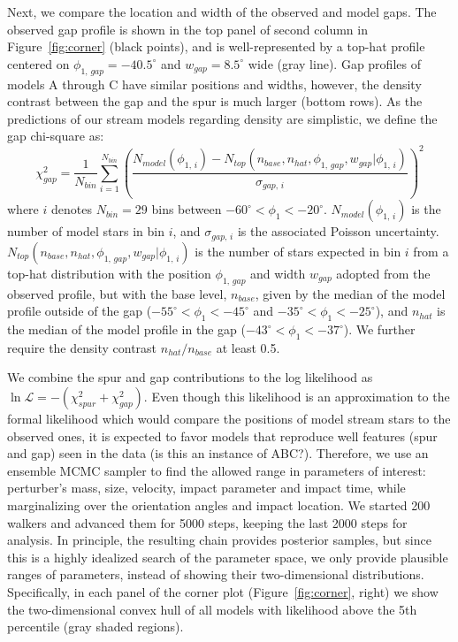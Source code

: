 \documentclass[12pt, modern]{aastex62}
\begin{document}
Next, we compare the location and width of the observed and model gaps.
The observed gap profile is shown in the top panel of second column in Figure~\ref{fig:corner} (black points), and is well-represented by a top-hat profile centered on $\phi_{1,\,gap}=-40.5^\circ$ and $w_{gap}=8.5^\circ$ wide (gray line).
Gap profiles of models A through C have similar positions and widths, however, the density contrast between the gap and the spur is much larger (bottom rows).
As the predictions of our stream models regarding density are simplistic, we define the gap chi-square as:
\begin{equation}
\chi^2_{gap} = \frac{1}{N_{bin}}\sum_{i=1}^{N_{bin}} \left(\frac{N_{model}(\phi_{1,\,i}) - N_{top}(n_{base}, n_{hat}, \phi_{1,\,gap}, w_{gap} | \phi_{1,\,i})}{\sigma_{gap,\,i}}\right)^2
\end{equation}
where $i$ denotes $N_{bin}=29$ bins between $-60^\circ<\phi_1<-20^\circ$.
$N_{model}(\phi_{1,\,i})$ is the number of model stars in bin $i$, and $\sigma_{gap,\,i}$ is the associated Poisson uncertainty.
$N_{top}(n_{base}, n_{hat}, \phi_{1,\,gap}, w_{gap} | \phi_{1,\,i})$ is the number of stars expected in bin $i$ from a top-hat distribution with the position $\phi_{1,\,gap}$ and width $w_{gap}$ adopted from the observed profile, but with the base level, $n_{base}$, given by the median of the model profile outside of the gap ($-55^\circ<\phi_1<-45^\circ$ and $-35^\circ<\phi_1<-25^\circ$), and $n_{hat}$ is the median of the model profile in the gap ($-43^\circ<\phi_1<-37^\circ$).
We further require the density contrast $n_{hat} / n_{base}$ at least 0.5.

We combine the spur and gap contributions to the log likelihood as $\ln\mathcal{L} = -(\chi^2_{spur} + \chi^2_{gap})$.
Even though this likelihood is an approximation to the formal likelihood which would compare the positions of model stream stars to the observed ones, it is expected to favor models that reproduce well features (spur and gap) seen in the data (is this an instance of ABC?).
Therefore, we use an ensemble MCMC sampler \citep{Foreman-Mackey:2013} to find the allowed range in parameters of interest: perturber's mass, size, velocity, impact parameter and impact time, while marginalizing over the orientation angles and impact location.
We started 200 walkers and advanced them for 5000 steps, keeping the last 2000 steps for analysis.
In principle, the resulting chain provides posterior samples, but since this is a highly idealized search of the parameter space, we only provide plausible ranges of parameters, instead of showing their two-dimensional distributions.
Specifically, in each panel of the corner plot (Figure~\ref{fig:corner}, right) we show the two-dimensional convex hull of all models with likelihood above the 5th percentile (gray shaded regions).
\end{document}
